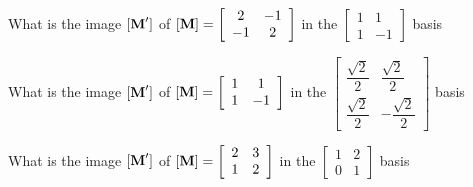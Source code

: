 
\bexo
What is the image $[\textbf{M}']$ of 
$[\textbf{M}]=\left[
\begin{array}{cc}
2 & -1 \\
-1 & 2
\end{array}
\right]
$
 in the 
$\left[
\begin{array}{cc}
1 & 1 \\
1 & -1
\end{array}
\right]
$ basis

\eexo\solution{
\begin{equation*}
[\tb{M}']=\left[
\begin{array}{cc}
3 & 0 \\
0 & 1
\end{array}
\right]
\end{equation*}
}

\bexo
What is the image $[\textbf{M}']$ of 
$[\textbf{M}]=\left[
\begin{array}{cc}
1 & 1 \\
1 & -1
\end{array}
\right]
$
 in the 
$\left[
\begin{array}{cc}
\dfrac{\sqrt{2}}{2} & \dfrac{\sqrt{2}}{2} \\
\dfrac{\sqrt{2}}{2} & -\dfrac{\sqrt{2}}{2}
\end{array}
\right]
$ basis

\eexo\solution{
\begin{equation*}
[\tb{M}']=\left[
\begin{array}{cc}
1 & 1 \\
1 & -1
\end{array}
\right]
\end{equation*}
}


\bexo
What is the image $[\textbf{M}']$ of 
$[\textbf{M}]=\left[
\begin{array}{cc}
2 & 3 \\
1 & 2
\end{array}
\right]
$
 in the 
$\left[
\begin{array}{cc}
1 & 2 \\
0& 1
\end{array}
\right]
$ basis

\eexo\solution{
\begin{equation*}
[\tb{M}']=\left[
\begin{array}{cc}
0 & -1 \\
1 & 4
\end{array}
\right]
\end{equation*}
}

